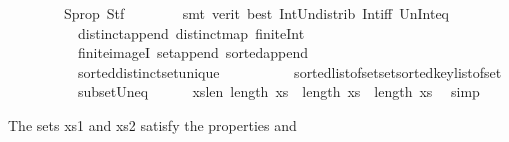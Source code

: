 \begin{isabellebody}
\ \ \ \ \ \ \ \ S{}{\isacharunderscore}{\kern0pt}prop{\isacharparenleft}{\kern0pt}{}{\isacharparenright}{\kern0pt}\ S{}tf\isanewline
\ \ \ \ \ \ \isamarkupfalse%
\ {\isacharparenleft}{\kern0pt}smt\ {\isacharparenleft}{\kern0pt}verit{\isacharcomma}{\kern0pt}\ best{\isacharparenright}{\kern0pt}\ Int{\isacharunderscore}{\kern0pt}Un{\isacharunderscore}{\kern0pt}distrib{}\ Int{\isacharunderscore}{\kern0pt}iff\ Un{\isacharunderscore}{\kern0pt}Int{\isacharunderscore}{\kern0pt}eq{\isacharparenleft}{\kern0pt}{}{\isacharparenright}{\kern0pt}\isanewline
\ \ \ \ \ \ \ \ \ \ distinct{\isacharunderscore}{\kern0pt}append\ distinct{\isacharunderscore}{\kern0pt}map\ finite{\isacharunderscore}{\kern0pt}Int\isanewline
\ \ \ \ \ \ \ \ \ \ finite{\isacharunderscore}{\kern0pt}imageI\ set{\isacharunderscore}{\kern0pt}append\ sorted{\isacharunderscore}{\kern0pt}append\isanewline
\ \ \ \ \ \ \ \ \ \ sorted{\isacharunderscore}{\kern0pt}distinct{\isacharunderscore}{\kern0pt}set{\isacharunderscore}{\kern0pt}unique\isanewline
\ \ \ \ \ \ \ \ \ \ sorted{\isacharunderscore}{\kern0pt}list{\isacharunderscore}{\kern0pt}of{\isacharunderscore}{\kern0pt}set{\isachardot}{\kern0pt}set{\isacharunderscore}{\kern0pt}sorted{\isacharunderscore}{\kern0pt}key{\isacharunderscore}{\kern0pt}list{\isacharunderscore}{\kern0pt}of{\isacharunderscore}{\kern0pt}set\isanewline
\ \ \ \ \ \ \ \ \ \ subset{\isacharunderscore}{\kern0pt}Un{\isacharunderscore}{\kern0pt}eq{\isacharparenright}{\kern0pt}\isanewline
\ \ \ \ \isamarkupfalse%
\ xs{\isacharunderscore}{\kern0pt}len{\isacharcolon}{\kern0pt}\ {\isachardoublequoteopen}length\ xs\ {\isacharequal}{\kern0pt}\ length\ xs{}\ {\isacharplus}{\kern0pt}\ length\ xs{}{\isachardoublequoteclose}\ \isamarkupfalse%
\ simp%
\begin{isamarkuptext}%
The sets xs1 and xs2 satisfy the properties  and  %

\end{isamarkuptext}
\end{isabellebody}
